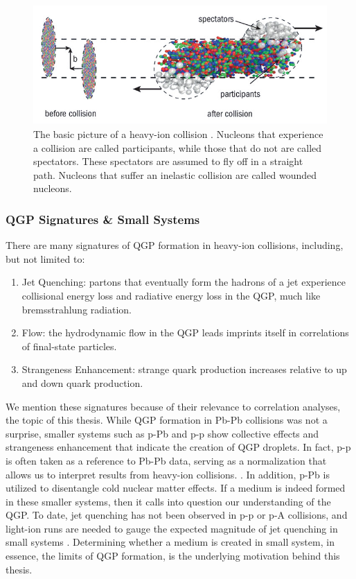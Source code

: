 \documentclass[../main.tex]{subfiles}
\begin{document}
\begin{figure}[h]
    \centering
    \includegraphics[scale=0.5]{introduction/figs/glauber.png}
    \caption{The basic picture of a heavy-ion collision \cite{participants}. Nucleons that experience a collision are called participants, while those that do not are called spectators. These spectators are assumed to fly off in a straight path. Nucleons that suffer an inelastic collision are called wounded nucleons.}
    \label{fig:spectators}
\end{figure}


\subsubsection{QGP Signatures \& Small Systems}
There are many signatures of QGP formation in heavy-ion collisions, including, but not limited to:

\begin{enumerate}
    \item Jet Quenching: partons that eventually form the hadrons of a jet experience collisional energy loss and radiative energy loss in the QGP, much like bremsstrahlung radiation. 
    \item Flow: the hydrodynamic flow in the QGP leads imprints itself in correlations of final-state particles. 
    \item Strangeness Enhancement: strange quark production increases relative to up and down quark production. 
\end{enumerate}

We mention these signatures because of their relevance to correlation analyses, the topic of this thesis. While QGP formation in Pb-Pb collisions was not a surprise, smaller systems such as p-Pb and p-p show collective effects and strangeness enhancement that indicate the creation of QGP droplets. In fact, p-p is often taken as a reference to Pb-Pb data, serving as a normalization that allows us to interpret results from heavy-ion collisions.  \cite{Florkowski:pheno}. In addition, p-Pb is utilized to disentangle cold nuclear matter effects. If a medium is indeed formed in these smaller systems, then it calls into question our understanding of the QGP. To date, jet quenching has not been observed in p-p or p-A collisions, and light-ion runs are needed to gauge the expected magnitude of jet quenching in small systems \cite{Achenbach:2023pba}. Determining whether a medium is created in small system, in essence, the limits of QGP formation, is the underlying motivation behind this thesis. 
\end{document}
